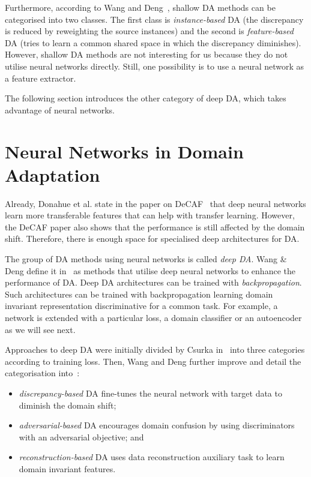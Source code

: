 Furthermore, according to Wang and Deng~\cite{wang2018},
shallow DA methods can be categorised into two classes.
The first class is \textit{instance-based} DA
(the discrepancy is reduced by reweighting the source instances)
and the second is \textit{feature-based} DA
(tries to learn a common shared space in which the discrepancy diminishes).
However, shallow DA methods are not interesting for us
because they do not utilise neural networks directly.
Still, one possibility is to use a neural network as a feature extractor.~\cite{csurka2017}

The following section introduces the other category of deep DA,
which takes advantage of neural networks.

\section{Neural Networks in Domain Adaptation}

Already, Donahue et al. state in the paper on DeCAF~\cite{donahue2014}
that deep neural networks learn more transferable features
that can help with transfer learning.
However, the DeCAF paper also shows
that the performance is still affected by the domain shift.
Therefore, there is enough space for specialised deep architectures for DA.

The group of DA methods using neural networks is called \textit{deep DA}.
Wang \& Deng define it in~\cite{wang2018} as methods that utilise deep neural networks to enhance the performance of DA.
Deep DA architectures can be trained with \textit{backpropagation}.
Such architectures can be trained with backpropagation
learning domain invariant representation discriminative for a common task.
For example, a network is extended with a particular loss, a domain classifier or an autoencoder as we will see next.

Approaches to deep DA were initially divided by Csurka in~\cite{csurka2017} into three categories according to training loss.
Then, Wang and Deng further improve and detail the categorisation into~\cite{wang2018}:

\begin{itemize}
	\item \textit{discrepancy-based} DA fine-tunes the neural network
		with target data to diminish the domain shift;
	\item \textit{adversarial-based} DA encourages domain confusion
		by using discriminators with an adversarial objective; and
	\item \textit{reconstruction-based} DA uses data reconstruction auxiliary task to learn domain invariant features.
\end{itemize}

